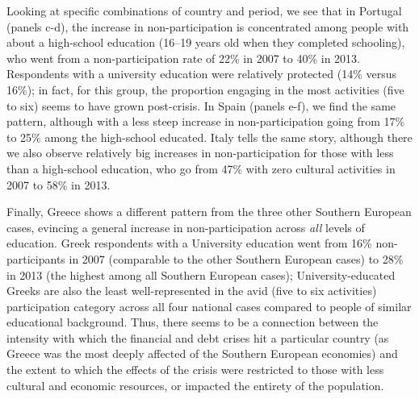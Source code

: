 \documentclass{article}
\begin{document}
Looking at specific combinations of country and period, we see that in Portugal (panels c-d), the increase in non-participation is concentrated among people with about a high-school education (16–19 years old when they completed schooling), who went from a non-participation rate of 22\% in 2007 to 40\% in 2013. Respondents with a university education were relatively protected (14\% versus 16\%); in fact, for this group, the proportion engaging in the most activities (five to six) seems to have grown post-crisis. In Spain (panels e-f), we find the same pattern, although with a less steep increase in non-participation going from 17\% to 25\% among the high-school educated. Italy tells the same story, although there we also observe relatively big increases in non-participation for those with less than a high-school education, who go from 47\% with zero cultural activities in 2007 to 58\% in 2013. 

Finally, Greece shows a different pattern from the three other Southern European cases, evincing a general increase in non-participation across {\em all} levels of education. Greek respondents with a University education went from 16\% non-participants in 2007 (comparable to the other Southern European cases) to 28\% in 2013 (the highest among all Southern European cases); University-educated Greeks are also the least well-represented in the avid (five to six activities) participation category across all four national cases compared to people of similar educational background. Thus, there seems to be a connection between the intensity with which the financial and debt crises hit a particular country (as Greece was the most deeply affected of the Southern European economies) and the extent to which the effects of the crisis were restricted to those with less cultural and economic resources, or impacted the entirety of the population. 
\end{document}
